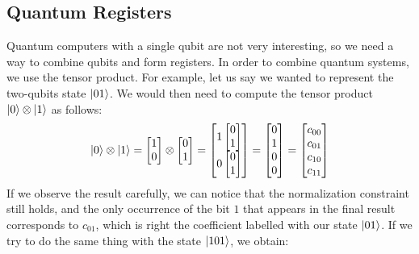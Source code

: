 \documentclass[12pt,a4paper]{report}
\theoremstyle{definition}
\theoremstyle{definition}
\theoremstyle{definition}
\begin{document}
\subsection{Quantum Registers}
Quantum computers with a single qubit are not very interesting, so we need a way to combine qubits and form registers. In order to combine quantum systems, we use the tensor product.
For example, let us say we wanted to represent the two-qubits state $\ket{01}$. We would then need to compute the tensor product $\ket{0}\otimes\ket{1}$ as follows:
\begin{equation*}
    \ket{0}\otimes\ket{1}=\begin{bmatrix}
        1\\
        0
    \end{bmatrix}\otimes\begin{bmatrix}
        0\\
        1
    \end{bmatrix}=\begin{bmatrix}
        1\begin{bmatrix}
            0\\
            1
        \end{bmatrix}\\
        0\begin{bmatrix}
            0\\
            1
        \end{bmatrix}
    \end{bmatrix}=\begin{bmatrix}
            0\\
            1\\
            0\\
            0
    \end{bmatrix}=\begin{bmatrix}
            c_{00}\\
            c_{01}\\
            c_{10}\\
            c_{11}
    \end{bmatrix}
\end{equation*}
If we observe the result carefully, we can notice that the normalization constraint still holds, and the only occurrence of the bit $1$ that appears in the final result corresponds to $c_{01}$, which is right the coefficient labelled with our state $\ket{01}$. If we try to do the same thing with the state $\ket{101}$, we obtain:
\end{document}
